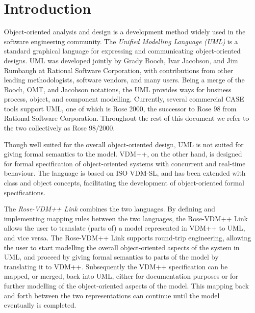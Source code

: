 \documentclass[\pformat,12pt]{article}
\newcommand{\vdmpp}{VDM++}
\newcommand{\link}{Rose-\vdmpp{} Link}
\newcommand{\rose}{Rose 98/2000}
\begin{document}




\section{Introduction}
\label{intro}

Object-oriented analysis and design is a development method widely
used in the software engineering community. The {\it Unified Modelling
  Language (UML)} is a standard graphical language for expressing and
communicating object-oriented designs. UML was developed jointly by
Grady Booch, Ivar Jacobson, and Jim Rumbaugh at Rational Software
Corporation, with contributions from other leading methodologists,
software vendors, and many users. Being a merge of the Booch, OMT, and
Jacobson notations, the UML provides ways for business process,
object, and component modelling. Currently, several commercial CASE
tools support UML, one of which is Rose 2000, the successor to Rose 98
from Rational Software Corporation. Throughout the rest of this
document we refer to the two collectively as \rose{}.

Though well suited for the overall object-oriented design, UML is not
suited for giving formal semantics to the model. \vdmpp{}, on the
other hand, is designed for formal specification of object-oriented
systems with concurrent and real-time behaviour. The language is based
on ISO VDM-SL, and has been extended with class and object concepts,
facilitating the development of object-oriented formal specifications.

The {\it \link{}} combines the two languages. By defining and
implementing mapping rules between the two languages, the \link{}
allows the user to translate (parts of) a model represented in
\vdmpp{} to UML, and vice versa. The \link{} supports round-trip
engineering, allowing the user to start modelling the overall
object-oriented aspects of the system in UML, and proceed by giving
formal semantics to parts of the model by translating it to
\vdmpp{}. Subsequently the \vdmpp{} specification can be mapped, or merged,
back into UML, either for documentation purposes or
for further modelling of the object-oriented aspects of the
model. This mapping back and forth between the two representations can
continue until the model eventually is completed.
\end{document}
